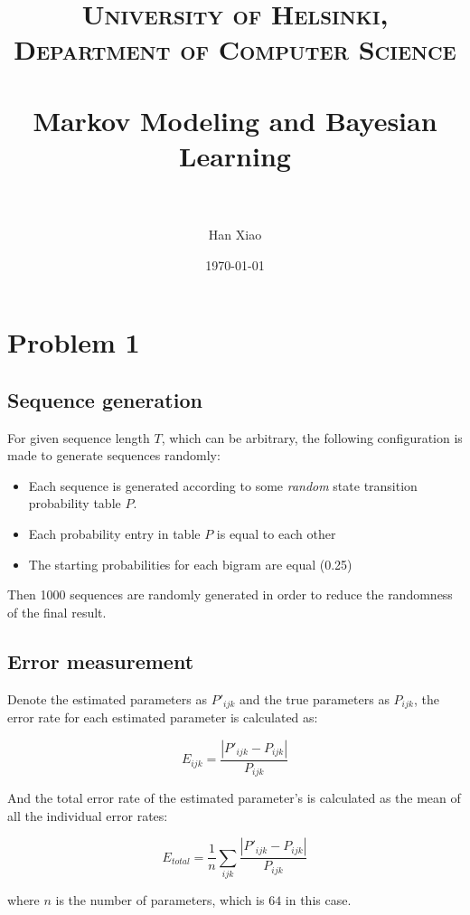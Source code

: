 \documentclass[paper=a4, fontsize=11pt]{scrartcl} %
\title{	
\normalfont \normalsize 
\textsc{University of Helsinki, Department of Computer Science} \\ [25pt] %
\horrule{0.5pt} \\[0.4cm] %
\huge Markov Modeling and Bayesian Learning \\ %
\horrule{2pt} \\[0.5cm] %
}
\author{Han Xiao} %
\date{\normalsize\today} %
\numberwithin{equation}{section} %
\numberwithin{figure}{section} %
\numberwithin{table}{section} %
\begin{document}
\maketitle %


\section{Problem 1}

\subsection{Sequence generation}

For given sequence length $T$, which can be arbitrary, the following configuration is made to generate sequences randomly:

\begin {itemize}
  \item Each sequence is generated according to some {\em random} state transition probability table $P$.
  \item Each probability entry in table $P$ is  equal to each other
  \item The starting probabilities for each bigram are equal (0.25)
\end {itemize}

Then 1000 sequences are randomly generated in order to reduce the randomness of the final result. 

\subsection{Error measurement}
Denote the estimated parameters as $P'_{ijk}$ and the true parameters as $P_{ijk}$, the error rate for each estimated parameter is calculated as:

\[ E_{ijk} = \frac{|P'_{ijk} - P_{ijk}|} {P_{ijk}} \]

And the total error rate of the estimated parameter's is calculated as the mean of all the individual error rates:

\[E_{total} = \frac {1} {n} \sum\limits_{ijk} \frac{|P'_{ijk} - P_{ijk}| }{ P_{ijk}}\]

where $n$ is the number of parameters, which is $64$ in this case.
\end{document}
